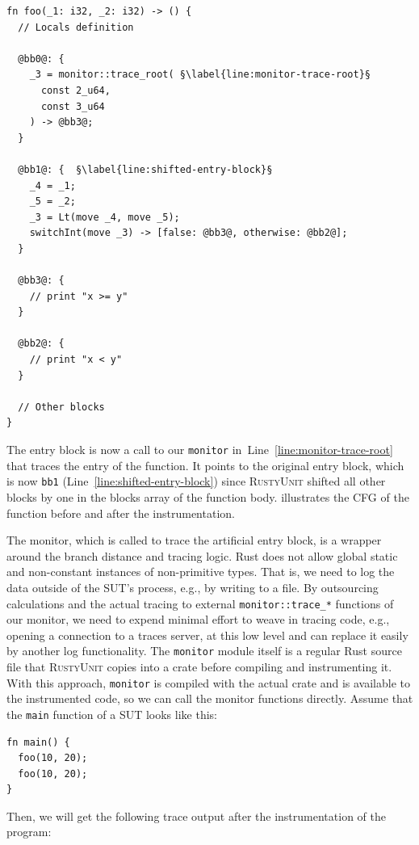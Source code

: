 \documentclass[paper=a4,%
  twoside,%
  BCOR4mm,%
  abstract=true,%
  toc=bibliography,%
  chapterprefix=true,%
  toc=bibliographynumbered,%
  open=right,%
  english,%
  pagesize=pdftex]{scrreprt}
\newcommand{\tech}{\textsc{RustyUnit}\xspace}
\newcommand{\cfg}{\ac{CFG}\xspace}
\newcommand{\sut}{\ac{SUT}\xspace}
\begin{document}
\begin{lstlisting}[language={MIR}, style=boxed, caption={}, escapechar=§, label=lst:mir-instrument-root]
fn foo(_1: i32, _2: i32) -> () {
  // Locals definition

  @bb0@: {
    _3 = monitor::trace_root( §\label{line:monitor-trace-root}§
      const 2_u64, 
      const 3_u64
    ) -> @bb3@;
  }

  @bb1@: {  §\label{line:shifted-entry-block}§
    _4 = _1;
    _5 = _2;
    _3 = Lt(move _4, move _5);
    switchInt(move _3) -> [false: @bb3@, otherwise: @bb2@];
  }

  @bb3@: {
    // print "x >= y"
  }

  @bb2@: {
    // print "x < y"
  }

  // Other blocks
}
\end{lstlisting}

The entry block is now a call to our \texttt{monitor} in~Line~\ref{line:monitor-trace-root} that traces the entry of the function. It points to the original entry block, which is now \texttt{bb1} (Line~\ref{line:shifted-entry-block}) since \tech shifted all other blocks by one in the blocks array of the function body.  illustrates the \cfg of the function before and after the instrumentation.

The monitor, which is called to trace the artificial entry block, is a wrapper around the branch distance and tracing logic. Rust does not allow global static and non-constant instances of non-primitive types. That is, we need to log the data outside of the \sut's process, e.g., by writing to a file. By outsourcing calculations and the actual tracing to external \texttt{monitor::trace\string_*} functions of our monitor, we need to expend minimal effort to weave in tracing code, e.g., opening a connection to a traces server, at this low level and can replace it easily by another log functionality. The \texttt{monitor} module itself is a regular Rust source file that \tech copies into a crate before compiling and instrumenting it. With this approach, \texttt{monitor} is compiled with the actual crate and is available to the instrumented code, so we can call the monitor functions directly. Assume that the \texttt{main} function of a \sut looks like this:
\begin{lstlisting}[style=boxed, caption={}]
fn main() {
  foo(10, 20);
  foo(10, 20);
}
\end{lstlisting}

Then, we will get the following trace output after the instrumentation of the program:
\end{document}
